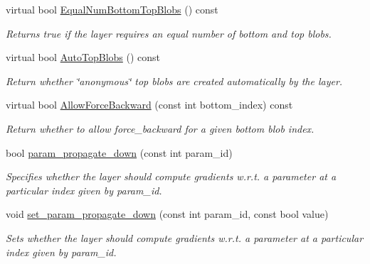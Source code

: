\begin{DoxyCompactItemize}
virtual bool \hyperlink{classcaffe_1_1Layer_ad412187a0483c310bd59fd5f957faf0d}{Equal\+Num\+Bottom\+Top\+Blobs} () const 
\begin{DoxyCompactList}\small\item\em Returns true if the layer requires an equal number of bottom and top blobs. \end{DoxyCompactList}\item 
virtual bool \hyperlink{classcaffe_1_1Layer_ad732ca94cb21b4c4e0d6372a530ededf}{Auto\+Top\+Blobs} () const 
\begin{DoxyCompactList}\small\item\em Return whether \char`\"{}anonymous\char`\"{} top blobs are created automatically by the layer. \end{DoxyCompactList}\item 
virtual bool \hyperlink{classcaffe_1_1Layer_a4a2e4ca94eaa1cbc054b512c6657743e}{Allow\+Force\+Backward} (const int bottom\+\_\+index) const 
\begin{DoxyCompactList}\small\item\em Return whether to allow force\+\_\+backward for a given bottom blob index. \end{DoxyCompactList}\item 
bool \hyperlink{classcaffe_1_1Layer_a1a3708013b0231e71d725252e10ce6e3}{param\+\_\+propagate\+\_\+down} (const int param\+\_\+id)
\begin{DoxyCompactList}\small\item\em Specifies whether the layer should compute gradients w.\+r.\+t. a parameter at a particular index given by param\+\_\+id. \end{DoxyCompactList}\item 
void \hyperlink{classcaffe_1_1Layer_a9a6fcb843803ed556f0a69cc2864379b}{set\+\_\+param\+\_\+propagate\+\_\+down} (const int param\+\_\+id, const bool value)\hypertarget{classcaffe_1_1Layer_a9a6fcb843803ed556f0a69cc2864379b}{}\label{classcaffe_1_1Layer_a9a6fcb843803ed556f0a69cc2864379b}

\begin{DoxyCompactList}\small\item\em Sets whether the layer should compute gradients w.\+r.\+t. a parameter at a particular index given by param\+\_\+id. \end{DoxyCompactList}\end{DoxyCompactItemize}
